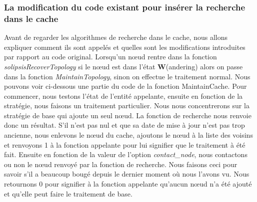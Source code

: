 \subsubsection{La modification du code existant pour insérer la recherche dans le cache}

 Avant de regarder les algorithmes de recherche dans le cache, nous allons expliquer comment ils sont appelés et quelles sont les modifications introduites par rapport au code original. Lorsqu'un nœud rentre dans la fonction \textit{solipsisRecoverTopology} si le nœud est dans l'état \textbf{W}(andering) alors on passe dans la fonction \textit{MaintainTopology}, sinon on effectue le traitement normal. Nous pouvons voir ci-dessous une partie du code de la fonction MaintainCache. Pour commencer, nous testons l'état de l'entité appelante, ensuite en fonction de la stratégie, nous faisons un traitement particulier. Nous nous concentrerons sur la stratégie de base qui ajoute un seul nœud. La fonction de recherche nous renvoie donc un résultat. S'il n'est pas nul et que sa date de mise à jour n'est pas trop ancienne, nous enlevons le nœud du cache, ajoutons le nœud à la liste des voisins et renvoyons 1 à la fonction appelante pour lui signifier que le traitement à été fait. Ensuite en fonction de la valeur de l'option \textit{contact\_node}, nous contactons ou non le nœud renvoyé par la fonction de recherche. Nous faisons ceci pour savoir s'il a beaucoup bougé depuis le dernier moment où nous l'avons vu. Nous retournons 0 pour signifier à la fonction appelante qu'aucun nœud n'a été ajouté et qu'elle peut faire le traitement de base.

\lstset{numbers=left,basicstyle=\scriptsize, numberstyle=\tiny, stepnumber=5, numbersep=5pt}






